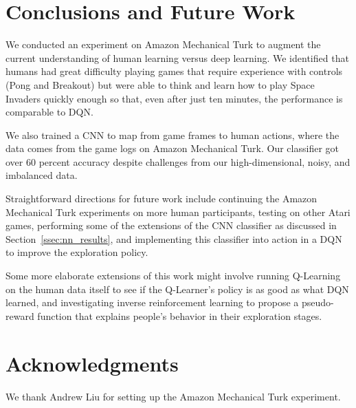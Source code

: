 \documentclass[letterpaper, 10 pt, conference]{ieeeconf}  %
\begin{document}
\section{Conclusions and Future Work}\label{sec:conclusions}

We conducted an experiment on Amazon Mechanical Turk to augment the current understanding of human
learning versus deep learning. We identified that humans had great difficulty playing games that
require experience with controls (Pong and Breakout) but were able to think and learn how to play
Space Invaders quickly enough so that, even after just ten minutes, the performance is comparable to
DQN.

We also trained a CNN to map from game frames to human actions, where the data comes from the game
logs on Amazon Mechanical Turk. Our classifier got over 60 percent accuracy despite challenges
from our high-dimensional, noisy, and imbalanced data.

Straightforward directions for future work include continuing the Amazon Mechanical Turk experiments
on more human participants, testing on other Atari games, performing some of the extensions of the
CNN classifier as discussed in Section~\ref{ssec:nn_results}, and implementing this classifier into
action in a DQN to improve the exploration policy.

Some more elaborate extensions of this work might involve running Q-Learning on the human data
itself to see if the Q-Learner's policy is as good as what DQN learned, and investigating inverse
reinforcement learning to propose a pseudo-reward function that explains people's behavior in their
exploration stages.

\section*{Acknowledgments}

We thank Andrew Liu for setting up the Amazon Mechanical Turk experiment.



\addtolength{\textheight}{-12cm}
\end{document}
